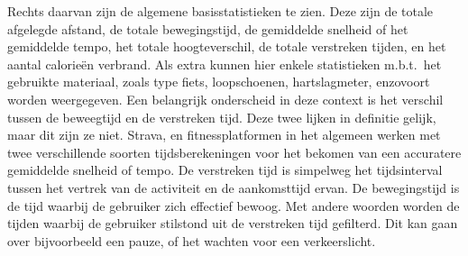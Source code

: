 Rechts daarvan zijn de algemene basisstatistieken te zien. Deze zijn de totale
afgelegde afstand, de totale bewegingstijd, de gemiddelde snelheid of het
gemiddelde tempo, het totale hoogteverschil, de totale verstreken tijden, en
het aantal calorieën verbrand. Als extra kunnen hier enkele statistieken
m.b.t.\ het gebruikte materiaal, zoals type fiets, loopschoenen, hartslagmeter,
enzovoort worden weergegeven. Een belangrijk onderscheid in deze context is het
verschil tussen de beweegtijd en de verstreken tijd. Deze twee lijken in
definitie gelijk, maar dit zijn ze niet. Strava, en fitnessplatformen in het
algemeen werken met twee verschillende soorten tijdsberekeningen voor het
bekomen van een accuratere gemiddelde snelheid of tempo. De verstreken tijd is
simpelweg het tijdsinterval tussen het vertrek van de activiteit en de
aankomsttijd ervan. De bewegingstijd is de tijd waarbij de gebruiker zich
effectief bewoog. Met andere woorden worden de tijden waarbij de gebruiker
stilstond uit de verstreken tijd gefilterd. Dit kan gaan over bijvoorbeeld een
pauze, of het wachten voor een verkeerslicht.

